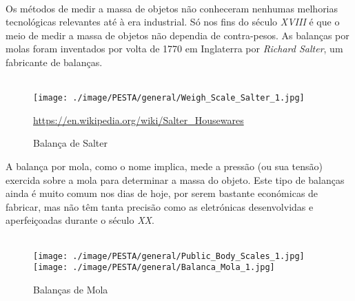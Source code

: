 \\
Os métodos de medir a massa de objetos não conheceram nenhumas melhorias tecnológicas relevantes até à era industrial. Só nos fins do século \textit{XVIII} é que o meio de medir a massa de objetos não dependia de contra-pesos. As balanças por molas foram inventados por volta de 1770 em Inglaterra por \textit{Richard Salter}, um fabricante de balanças.
\\
\\
\begin{figure}[H]
	\centering
	\texttt{[image: ./image/PESTA/general/Weigh\_Scale\_Salter\_1.jpg]}
	\caption{Balança de Salter}
	\url{https://en.wikipedia.org/wiki/Salter_Housewares}
	\label{Weigh_Scale_Salter_1}
\end{figure}
A balança por mola, como o nome implica, mede a pressão (ou sua tensão) exercida sobre a mola para determinar a massa do objeto. Este tipo de balanças ainda é muito comum nos dias de hoje, por serem bastante económicas de fabricar, mas não têm tanta precisão como as eletrónicas desenvolvidas e aperfeiçoadas durante o século \textit{XX}.
\\
\\
\begin{minipage}[!b]{\linewidth}
	\begin{figure}[H]
		\captionsetup{justification=raggedright,singlelinecheck=false}
		\flushleft
		\hspace{.4cm}
		\texttt{[image: ./image/PESTA/general/Public\_Body\_Scales\_1.jpg]}
		\hspace{.4cm}
		\texttt{[image: ./image/PESTA/general/Balanca\_Mola\_1.jpg]}
		\caption{Balanças de Mola}
		\label{Balanca_Mola_1}
	\end{figure}
\end{minipage}
